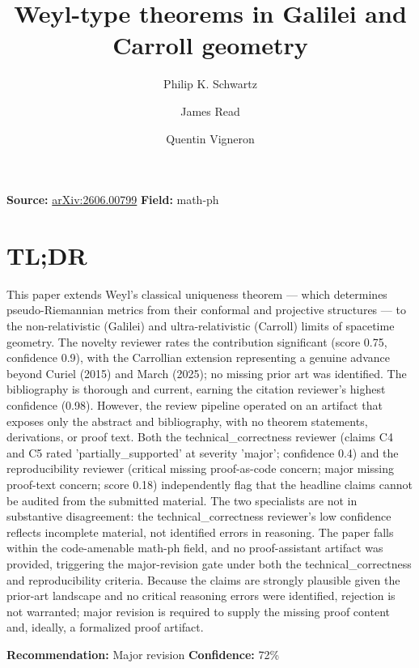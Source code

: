 \documentclass[11pt]{article}
\title{Weyl-type theorems in Galilei and Carroll geometry}
\author{Philip K. Schwartz \and James Read \and Quentin Vigneron}
\date{}
\begin{document}
\maketitle

\noindent\textbf{Source:} \href{https://arxiv.org/abs/2606.00799}{arXiv:2606.00799} \quad \textbf{Field:} math-ph\\

\section*{TL;DR}
This paper extends Weyl's classical uniqueness theorem — which determines pseudo-Riemannian metrics from their conformal and projective structures — to the non-relativistic (Galilei) and ultra-relativistic (Carroll) limits of spacetime geometry. The novelty reviewer rates the contribution significant (score 0.75, confidence 0.9), with the Carrollian extension representing a genuine advance beyond Curiel (2015) and March (2025); no missing prior art was identified. The bibliography is thorough and current, earning the citation reviewer's highest confidence (0.98). However, the review pipeline operated on an artifact that exposes only the abstract and bibliography, with no theorem statements, derivations, or proof text. Both the technical\_correctness reviewer (claims C4 and C5 rated 'partially\_supported' at severity 'major'; confidence 0.4) and the reproducibility reviewer (critical missing proof-as-code concern; major missing proof-text concern; score 0.18) independently flag that the headline claims cannot be audited from the submitted material. The two specialists are not in substantive disagreement: the technical\_correctness reviewer's low confidence reflects incomplete material, not identified errors in reasoning. The paper falls within the code-amenable math-ph field, and no proof-assistant artifact was provided, triggering the major-revision gate under both the technical\_correctness and reproducibility criteria. Because the claims are strongly plausible given the prior-art landscape and no critical reasoning errors were identified, rejection is not warranted; major revision is required to supply the missing proof content and, ideally, a formalized proof artifact.

\textbf{Recommendation:} Major revision \quad \textbf{Confidence:} 72\%\\
\end{document}
